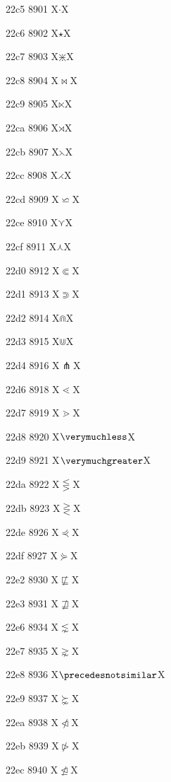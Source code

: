 \documentclass[11pt]{article}
\begin{document}
22c5 8901 X{\ensuremath{\cdot}}X

22c6 8902 X{\ensuremath{\star}}X

22c7 8903 X{\ensuremath{\divideontimes}}X

22c8 8904 X{\ensuremath{\bowtie}}X

22c9 8905 X{\ensuremath{\ltimes}}X

22ca 8906 X{\ensuremath{\rtimes}}X

22cb 8907 X{\ensuremath{\leftthreetimes}}X

22cc 8908 X{\ensuremath{\rightthreetimes}}X

22cd 8909 X{\ensuremath{\backsimeq}}X

22ce 8910 X{\ensuremath{\curlyvee}}X

22cf 8911 X{\ensuremath{\curlywedge}}X

22d0 8912 X{\ensuremath{\Subset}}X

22d1 8913 X{\ensuremath{\Supset}}X

22d2 8914 X{\ensuremath{\Cap}}X

22d3 8915 X{\ensuremath{\Cup}}X

22d4 8916 X{\ensuremath{\pitchfork}}X

22d6 8918 X{\ensuremath{\lessdot}}X

22d7 8919 X{\ensuremath{\gtrdot}}X

22d8 8920 X{\ensuremath{\verymuchless}}X

22d9 8921 X{\ensuremath{\verymuchgreater}}X

22da 8922 X{\ensuremath{\lesseqgtr}}X

22db 8923 X{\ensuremath{\gtreqless}}X

22de 8926 X{\ensuremath{\curlyeqprec}}X

22df 8927 X{\ensuremath{\curlyeqsucc}}X

22e2 8930 X{\ensuremath{\not\sqsubseteq}}X

22e3 8931 X{\ensuremath{\not\sqsupseteq}}X

22e6 8934 X{\ensuremath{\lnsim}}X

22e7 8935 X{\ensuremath{\gnsim}}X

22e8 8936 X{\ensuremath{\precedesnotsimilar}}X

22e9 8937 X{\ensuremath{\succnsim}}X

22ea 8938 X{\ensuremath{\ntriangleleft}}X

22eb 8939 X{\ensuremath{\ntriangleright}}X

22ec 8940 X{\ensuremath{\ntrianglelefteq}}X
\end{document}
